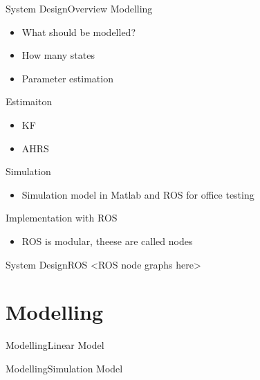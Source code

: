 \documentclass[10pt,handout]{beamer}
\begin{document}
\begin{frame}{System Design}{Overview}
Modelling
\begin{itemize}
\item What should be modelled?
\item How many states
\item Parameter estimation
\end{itemize}

Estimaiton
\begin{itemize}
\item KF
\item AHRS
\end{itemize}

Simulation
\begin{itemize}
\item Simulation model in Matlab and ROS for office testing
\end{itemize}

Implementation with ROS
\begin{itemize}
\item ROS is modular, theese are called nodes
\end{itemize}
\end{frame}

\begin{frame}{System Design}{ROS}
<ROS node graphs here>
\end{frame}

\section{Modelling}
\begin{frame}{Modelling}{Linear Model}

\end{frame}

\begin{frame}{Modelling}{Simulation Model}

\end{frame}

\end{document}

